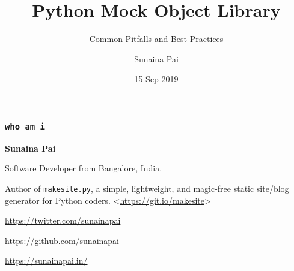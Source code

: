 \documentclass[xcolor={svgnames}]{beamer}
\title{Python Mock Object Library}
\subtitle{\texorpdfstring{\vspace{2mm}}{}Common Pitfalls and Best Practices}
\author{Sunaina Pai}
\institute[PyCon UK 2019, Cardiff, UK]{
    PyCon UK 2019, Cardiff City Hall, Cardiff, UK
}
\date{15 Sep 2019}
\newcommand{\ttcode}[2][]{\lstinline[style=plain,basicstyle=\ttfamily#1]{#2}}
\begin{document}
\frame{\titlepage}


\begin{frame}
    \frametitle{\ttcode{who am i}}

    \textbf{Sunaina Pai}

    \bigskip

    Software Developer from Bangalore, India.

    Author of \ttcode{makesite.py}, a simple, lightweight, and
    magic-free static site/blog generator for Python coders.
    \textless\url{https://git.io/makesite}\textgreater

    \bigskip

    \faTwitter{}
    \url{https://twitter.com/sunainapai}

    \faGithub{}
    \url{https://github.com/sunainapai}

    \faLink{}
    \url{https://sunainapai.in/}
\end{frame}
\end{document}
